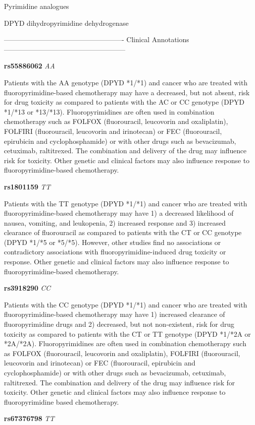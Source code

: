 \documentclass{resume} %
\begin{document}
\begin{rSection}{ Pyrimidine analogues }
\begin{rSubsection}{ DPYD }{ dihydropyrimidine dehydrogenase }{}{}
\item[] ---------------------------------------------------- Clinical Annotations -----------------------------------------------------\newline
\item \textbf{ rs55886062 } \textit{ AA }
\item[] Patients with the AA genotype (DPYD *1/*1) and cancer who are treated with fluoropyrimidine-based chemotherapy may have a decreased, but not absent, risk for drug toxicity as compared to patients with the AC or CC genotype (DPYD *1/*13 or *13/*13). Fluoropyrimidines are often used in combination chemotherapy such as FOLFOX (fluorouracil, leucovorin and oxaliplatin), FOLFIRI (fluorouracil, leucovorin and irinotecan) or FEC (fluorouracil, epirubicin and cyclophosphamide) or with other drugs such as bevacizumab, cetuximab, raltitrexed. The combination and delivery of the drug may influence risk for toxicity. Other genetic and clinical factors may also influence response to fluoropyrimidine-based chemotherapy.\item \textbf{ rs1801159 } \textit{ TT }
\item[] Patients with the TT genotype (DPYD *1/*1) and cancer who are treated with fluoropyrimidine-based chemotherapy may have 1) a decreased likelihood of nausea, vomiting, and leukopenia, 2) increased response and 3) increased clearance of fluorouracil as compared to patients with the CT or CC genotype (DPYD *1/*5 or *5/*5). However, other studies find no associations or contradictory associations with fluoropyrimidine-induced drug toxicity or response. Other genetic and clinical factors may also influence response to fluoropyrimidine-based chemotherapy.\item \textbf{ rs3918290 } \textit{ CC }
\item[] Patients with the CC genotype (DPYD *1/*1) and cancer who are treated with fluoropyrimidine-based chemotherapy may have 1) increased clearance of fluoropyrimidine drugs and 2) decreased, but not non-existent, risk for drug toxicity as compared to patients with the CT or TT genotype (DPYD *1/*2A or *2A/*2A). Fluoropyrimidines are often used in combination chemotherapy such as FOLFOX (fluorouracil, leucovorin and oxaliplatin), FOLFIRI (fluorouracil,  leucovorin and irinotecan) or FEC (fluorouracil, epirubicin and cyclophosphamide) or with other drugs such as bevacizumab, cetuximab, raltitrexed. The combination and delivery of the drug may influence risk for toxicity. Other genetic and clinical factors may also influence response to fluoropyrimidine based chemotherapy.\item \textbf{ rs67376798 } \textit{ TT }

\end{rSubsection}
\end{rSection}
\end{document}
